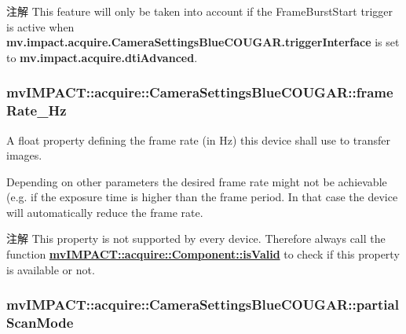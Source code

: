 \begin{DoxyNote}{注解}
This feature will only be taken into account if the {\ttfamily Frame\+Burst\+Start} trigger is active when {\bfseries mv.\+impact.\+acquire.\+Camera\+Settings\+Blue\+C\+O\+U\+G\+A\+R.\+trigger\+Interface} is set to {\bfseries mv.\+impact.\+acquire.\+dti\+Advanced}. 
\end{DoxyNote}
\hypertarget{classmv_i_m_p_a_c_t_1_1acquire_1_1_camera_settings_blue_c_o_u_g_a_r_a56f237d32d0634054baf9f760c9d4c87}{
\subsubsection[{frame\+Rate\+\_\+\+Hz}]{ mv\+I\+M\+P\+A\+C\+T\+::acquire\+::\+Camera\+Settings\+Blue\+C\+O\+U\+G\+A\+R\+::frame\+Rate\+\_\+\+Hz}}\label{classmv_i_m_p_a_c_t_1_1acquire_1_1_camera_settings_blue_c_o_u_g_a_r_a56f237d32d0634054baf9f760c9d4c87}


A float property defining the frame rate (in Hz) this device shall use to transfer images. 

Depending on other parameters the desired frame rate might not be achievable (e.\+g. if the exposure time is higher than the frame period. In that case the device will automatically reduce the frame rate. \begin{DoxyNote}{注解}
This property is not supported by every device. Therefore always call the function {\bfseries \hyperlink{classmv_i_m_p_a_c_t_1_1acquire_1_1_component_ac51e55e7e046101f3c6119d84123abd5}{mv\+I\+M\+P\+A\+C\+T\+::acquire\+::\+Component\+::is\+Valid}} to check if this property is available or not. 
\end{DoxyNote}
\hypertarget{classmv_i_m_p_a_c_t_1_1acquire_1_1_camera_settings_blue_c_o_u_g_a_r_af8680084295e56406aa41e2162204d79}{
\subsubsection[{partial\+Scan\+Mode}]{ mv\+I\+M\+P\+A\+C\+T\+::acquire\+::\+Camera\+Settings\+Blue\+C\+O\+U\+G\+A\+R\+::partial\+Scan\+Mode}}\label{classmv_i_m_p_a_c_t_1_1acquire_1_1_camera_settings_blue_c_o_u_g_a_r_af8680084295e56406aa41e2162204d79}


